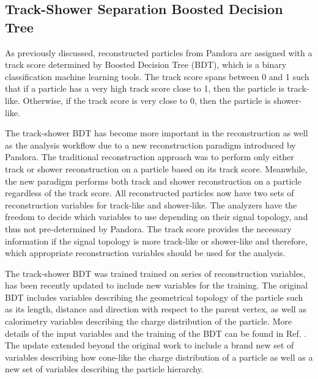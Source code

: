 \subsection{Track-Shower Separation Boosted Decision Tree}

As previously discussed, reconstructed particles from Pandora are assigned with a track score determined by Boosted Decision Tree (BDT), which is a binary classification machine learning tools.
The track score spans between 0 and 1 such that if a particle has a very high track score close to 1, then the particle is track-like.
Otherwise, if the track score is very close to 0, then the particle is shower-like.

The track-shower BDT has become more important in the reconstruction as well as the analysis workflow due to a new reconstruction paradigm introduced by Pandora.
The traditional reconstruction approach was to perform only either track or shower reconstruction on a particle based on its track score.
Meanwhile, the new paradigm performs both track and shower reconstruction on a particle regardless of the track score.
All reconstructed particles now have two sets of reconstruction variables for track-like and shower-like.
The analyzers have the freedom to decide which variables to use depending on their signal topology, and thus not pre-determined by Pandora.
The track score provides the necessary information if the signal topology is more track-like or shower-like and therefore, which appropriate reconstruction variables should be used for the analysis. 

The track-shower BDT was trained trained on series of reconstruction variables, has been recently updated to include new variables for the training.
The original BDT includes variables describing the geometrical topology of the particle such as its length, distance and direction with respect to the parent vertex, as well as calorimetry variables describing the charge distribution of the particle.
More details of the input variables and the training of the BDT can be found in Ref. \cite{EdPhD}.
The update extended beyond the original work to include a brand new set of variables describing how cone-like the charge distribution of a particle as well as a new set of variables describing the particle hierarchy.

